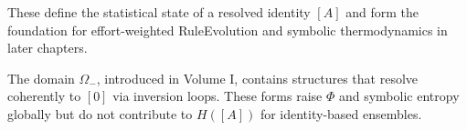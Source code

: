 These define the statistical state of a resolved identity $[A]$ and form the foundation for effort-weighted RuleEvolution and symbolic thermodynamics in later chapters.

\medskip

The domain $\Omega_-$, introduced in Volume I, contains structures that resolve coherently to $[0]$ via inversion loops. These forms raise $\Phi$ and symbolic entropy globally but do not contribute to $H([A])$ for identity-based ensembles.
